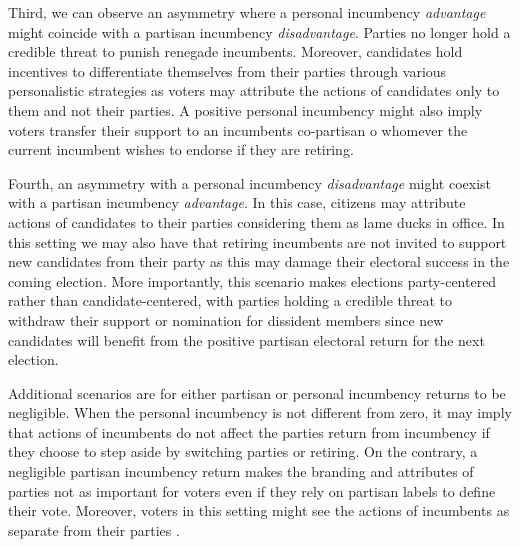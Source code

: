 \documentclass[12pt]{amsart}
\numberwithin{equation}{section}
\theoremstyle{definition}
\theoremstyle{definition}
\theoremstyle{definition}
\begin{document}
 Third, we can observe an asymmetry where a personal incumbency \emph{advantage} might coincide with a partisan incumbency \emph{disadvantage}. Parties no longer hold a credible threat to punish renegade incumbents. Moreover, candidates hold incentives to differentiate themselves from their parties through various personalistic strategies as voters may attribute the actions of candidates only to them and not their parties. A positive personal incumbency might also imply voters transfer their support to an incumbents co-partisan o whomever the current incumbent wishes to endorse if they are retiring. 
  
 
 Fourth, an asymmetry with a personal incumbency \emph{disadvantage} might coexist with a partisan incumbency \emph{advantage}. In this case, citizens may attribute actions of candidates to their parties considering them as lame ducks in office. In this setting we may also have that retiring incumbents are not invited to support new candidates from their party as this may damage their electoral success in the coming election. More importantly, this scenario makes elections party-centered rather than candidate-centered, with parties holding a credible threat to withdraw their support or nomination for dissident members since new candidates will benefit from the positive partisan electoral return for the next election.  

Additional scenarios are for either partisan or personal incumbency returns to be negligible. When the personal incumbency is not different from zero, it may imply that actions of incumbents do not affect the parties return from incumbency if they choose to step aside by switching parties or retiring. On the contrary, a negligible partisan incumbency return makes the branding and attributes of parties not as important for voters even if they rely on partisan labels to define their vote. Moreover, voters in this setting might see the actions of incumbents as separate from their parties \citep{fowler_hall_2014}. 
\end{document}
